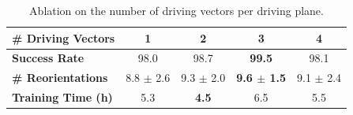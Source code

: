 \begin{table}
\centering
\caption{
Ablation on the number of driving vectors per driving plane.
}
\label{tab:vector_ablation}

\scriptsize
\setlength{\tabcolsep}{3pt}

\begin{tabular}{lcccc}
\toprule
\textbf{\# Driving Vectors} 
& \textbf{1} 
& \textbf{2} 
& \textbf{3} 
& \textbf{4} \\
\midrule

\textbf{Success Rate} 
& 98.0 
& 98.7
& \textbf{99.5} 
& 98.1 \\

\textbf{\# Reorientations} 
& 8.8 $\pm$ 2.6
& 9.3 $\pm$ 2.0
& \textbf{9.6 $\pm$ 1.5} 
& 9.1 $\pm$ 2.4 \\

\textbf{Training Time (h)} 
& 5.3 
& \textbf{4.5}
& 6.5
& 5.5 \\

\bottomrule
\end{tabular}

\vspace{-3mm}
\end{table}



\vspace{-2mm}
